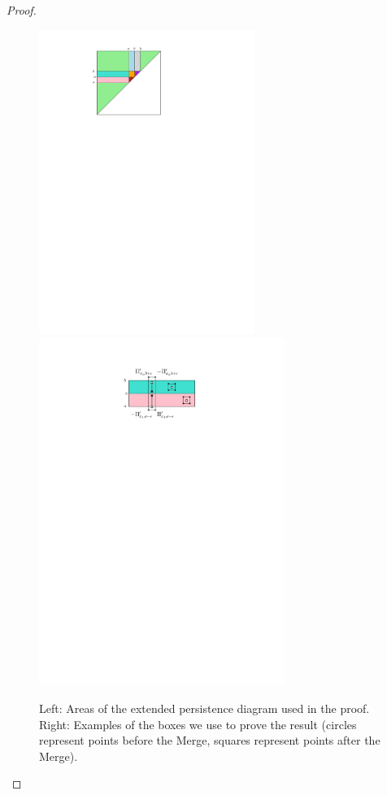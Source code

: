 \begin{proof}
\begin{figure}[h]
\begin{center}
\includegraphics[width=7cm]{figures/MergeAreas}\ \ \includegraphics[width=8cm]{figures/PersMeasure}
\caption[Persistence measure for Merge]{\label{fig:areas}
Left: Areas of the extended persistence diagram used in the proof.
Right: Examples of the boxes we use to prove the result (circles represent points before the Merge, squares represent points after the Merge).
}
\end{center}
\end{figure}


\end{proof}

